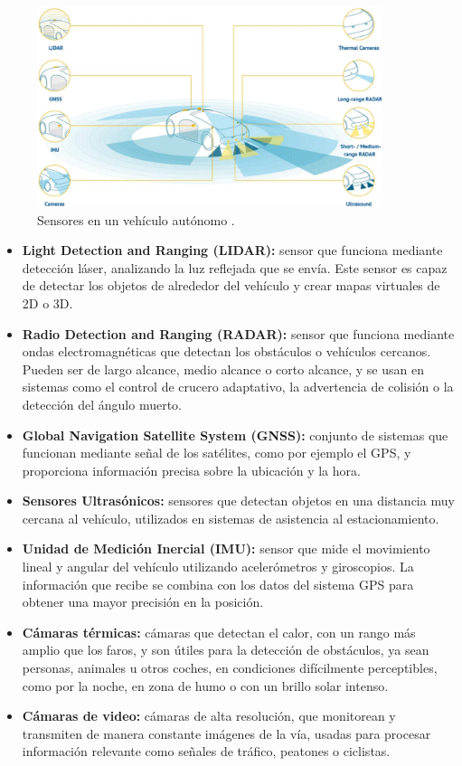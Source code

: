 \documentclass[12pt]{report} %
\begin{document}
\begin{figure}[h]
	\centering
	\includegraphics[width=0.9\textwidth]{saeSensors.png}
	\caption{Sensores en un vehículo autónomo \cite{autonomousVehicles}.}
	\label{fig:imagen20}
\end{figure}

\begin{itemize}

    \item \textbf{Light Detection and Ranging (LIDAR):} sensor que funciona mediante detección láser, analizando la luz reflejada que se envía. Este sensor es capaz de detectar los objetos de alrededor del vehículo y crear mapas virtuales de 2D o 3D.
    \item \textbf{Radio Detection and Ranging (RADAR):} sensor que funciona mediante ondas electromagnéticas que detectan los obstáculos o vehículos cercanos. Pueden ser de largo alcance, medio alcance o corto alcance, y se usan en sistemas como el control de crucero adaptativo, la advertencia de colisión o la detección del ángulo muerto.
    \item \textbf{Global Navigation Satellite System (GNSS):} conjunto de sistemas que funcionan mediante señal de los satélites, como por ejemplo el GPS, y proporciona información precisa sobre la ubicación y la hora.
    \item \textbf{Sensores Ultrasónicos:} sensores que detectan objetos en una distancia muy cercana al vehículo, utilizados en sistemas de asistencia al estacionamiento.
    \item \textbf{Unidad de Medición Inercial (IMU):} sensor que mide el movimiento lineal y angular del vehículo utilizando acelerómetros y giroscopios. La información que recibe se combina con los datos del sistema GPS para obtener una mayor precisión en la posición.
    \item \textbf{Cámaras térmicas:} cámaras que detectan el calor, con un rango más amplio que los faros, y son útiles para la detección de obstáculos, ya sean personas, animales u otros coches, en condiciones difícilmente perceptibles, como por la noche, en zona de humo o con un brillo solar intenso.
    \item \textbf{Cámaras de video:} cámaras de alta resolución, que monitorean y transmiten de manera constante imágenes de la vía, usadas para procesar información relevante como señales de tráfico, peatones o ciclistas.

\end{itemize}
\end{document}

